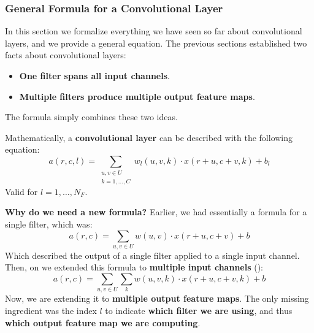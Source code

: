 \subsubsection{General Formula for a Convolutional Layer}\label{sec:general-formula-for-a-convolutional-layer}

In this section we formalize everything we have seen so far about convolutional layers, and we provide a general equation. The previous sections established two facts about convolutional layers:
\begin{itemize}
    \item \textbf{One filter spans all input channels}.
    \item \textbf{Multiple filters produce multiple output feature maps}.
\end{itemize}
The formula simply combines these two ideas.

\highspace
Mathematically, a \textbf{convolutional layer} can be described with the following equation:
\begin{equation}\label{eq:convolutional-layer}
    a\left(r,c,l\right) = \sum_{\substack{u,v \in U \\ k = 1, \dots, C}} w_{l}\left(u,v,k\right) \cdot x\left(r+u,c+v,k\right) + b_{l}
\end{equation}
Valid for $l = 1, \dots, N_{F}$.

\highspace
\textcolor{Green3}{ \textbf{Why do we need a new formula?}} Earlier, we had essentially a formula for a single filter, which was:
\begin{equation*}
    a\left(r,c\right) = \sum_{u,v \in U} w\left(u,v\right) \cdot x\left(r+u,c+v\right) + b
\end{equation*}
Which described the output of a single filter applied to a single input channel. Then, on  we extended this formula to \textbf{multiple input channels} ():
\begin{equation*}
    a\left(r,c\right) = \sum_{u,v \in U} \sum_{k} w\left(u,v,k\right) \cdot x\left(r+u, c+v, k\right) + b
\end{equation*}
Now, we are extending it to \textbf{multiple output feature maps}. The only missing ingredient was the index $l$ to indicate \textbf{which filter we are using}, and thus \textbf{which output feature map we are computing}.


